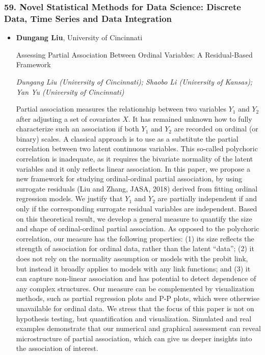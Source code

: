 \subsubsection*{59. Novel Statistical Methods for Data Science: Discrete Data, Time Series and Data Integration}

\begin{itemize}
\item \textbf{Dungang Liu}, University of Cincinnati

Assessing Partial Association Between Ordinal Variables: A Residual-Based Framework

\emph{\footnotesize Dungang Liu (University of Cincinnati); Shaobo Li (University of Kansas); Yan Yu (University of Cincinnati)}

Partial association measures the relationship between two variables $Y_1$ and $Y_2$ after adjusting a set of covariates $X$. It has remained unknown how to fully characterize such an association if both $Y_1$ and $Y_2$ are recorded on ordinal (or binary) scales. A classical approach is to use as a substitute the partial correlation between two latent continuous variables. This so-called polychoric correlation is inadequate, as it requires the bivariate normality of the latent variables and it only reflects linear association. In this paper, we propose a new framework for studying ordinal-ordinal partial association, by using surrogate residuals (Liu and Zhang, JASA, 2018) derived from fitting ordinal regression models. We justify that $Y_1$ and $Y_2$ are partially independent if and only if the corresponding surrogate residual variables are independent. Based on this theoretical result, we develop a general measure to quantify the size and shape of ordinal-ordinal partial association. As opposed to the polychoric correlation, our measure has the following properties: (1) its size reflects the strength of association for ordinal data, rather than the latent ``data''; (2) it does not rely on the normality assumption or models with the probit link, but instead it broadly applies to models with any link functions; and (3) it can capture non-linear association and has potential to detect dependence of any complex structures. Our measure can be complemented by visualization methods, such as partial regression plots and P-P plots, which were otherwise unavailable for ordinal data. We stress that the focus of this paper is not on hypothesis testing, but quantification and visualization. Simulated and real examples demonstrate that our numerical and graphical assessment can reveal microstructure of partial association, which can give us deeper insights into the association of interest.


\end{itemize}
